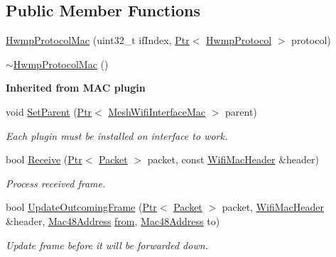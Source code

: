 \subsection*{Public Member Functions}
\begin{DoxyCompactItemize}
\item 
\hyperlink{classns3_1_1dot11s_1_1HwmpProtocolMac_a220af4f141c3d06366231c0943df1aae}{Hwmp\+Protocol\+Mac} (uint32\+\_\+t if\+Index, \hyperlink{classns3_1_1Ptr}{Ptr}$<$ \hyperlink{classns3_1_1dot11s_1_1HwmpProtocol}{Hwmp\+Protocol} $>$ protocol)
\item 
\hyperlink{classns3_1_1dot11s_1_1HwmpProtocolMac_ad75211acb9864bfbe4c56207396f60c0}{$\sim$\+Hwmp\+Protocol\+Mac} ()
\end{DoxyCompactItemize}
\begin{Indent}{\bf Inherited from M\+AC plugin}\par
\begin{DoxyCompactItemize}
\item 
void \hyperlink{classns3_1_1dot11s_1_1HwmpProtocolMac_ab9136721107d470d09568c1cf514a047}{Set\+Parent} (\hyperlink{classns3_1_1Ptr}{Ptr}$<$ \hyperlink{classns3_1_1MeshWifiInterfaceMac}{Mesh\+Wifi\+Interface\+Mac} $>$ parent)
\begin{DoxyCompactList}\small\item\em Each plugin must be installed on interface to work. \end{DoxyCompactList}\item 
bool \hyperlink{classns3_1_1dot11s_1_1HwmpProtocolMac_a7d33d166ab3c21ef0294c2e471e18e52}{Receive} (\hyperlink{classns3_1_1Ptr}{Ptr}$<$ \hyperlink{classns3_1_1Packet}{Packet} $>$ packet, const \hyperlink{classns3_1_1WifiMacHeader}{Wifi\+Mac\+Header} \&header)
\begin{DoxyCompactList}\small\item\em Process received frame. \end{DoxyCompactList}\item 
bool \hyperlink{classns3_1_1dot11s_1_1HwmpProtocolMac_ac4e4a220e540cb34c502fa62fe391ef2}{Update\+Outcoming\+Frame} (\hyperlink{classns3_1_1Ptr}{Ptr}$<$ \hyperlink{classns3_1_1Packet}{Packet} $>$ packet, \hyperlink{classns3_1_1WifiMacHeader}{Wifi\+Mac\+Header} \&header, \hyperlink{classns3_1_1Mac48Address}{Mac48\+Address} \hyperlink{lte__amc_8m_a1b4c81ff74eb1a626b5ade44c81004b3}{from}, \hyperlink{classns3_1_1Mac48Address}{Mac48\+Address} to)
\begin{DoxyCompactList}\small\item\em Update frame before it will be forwarded down. \end{DoxyCompactList}\item 

\end{DoxyCompactItemize}
\end{Indent}

